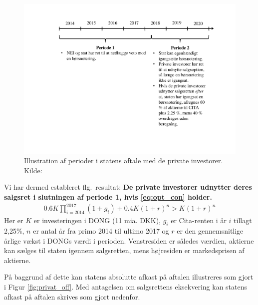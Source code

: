 \documentclass{article}
\begin{document}
\begin{figure}
\includegraphics[scale=0.6]{../figs/perioder}
\caption{Illustration af perioder i statens aftale med de private investorer. Kilde: \citet{FM2013a}}
\label{fig:comp}
\end{figure}









Vi har dermed estableret flg.\ resultat: \textbf{De private investorer udnytter deres salgsret i slutningen af periode 1, hvis \eqref{eq:opt_con} holder. } 
\begin{align}
0.6K\prod_{i=2014}^{2017}(1+g_i)+0.4K(1+r)^n>K(1+r)^n \label{eq:opt_con}
\end{align}
Her er $K$ er investeringen i DONG (11 mia. DKK), $g_i$ er Cita-renten i år $i$ tillagt 2,25\%, $n$ er antal år fra primo 2014 til ultimo 2017 og $r$ er den gennemsnitlige årlige vækst i DONGs værdi i perioden. Venstresiden er således værdien, aktierne kan sælges til staten igennem salgsretten, mens højresiden er markedsprisen af aktierne.

På baggrund af dette kan statens absolutte afkast på aftalen illustreres som gjort i Figur \ref{fig:privat_off}. Med antagelsen om salgsrettens eksekvering kan statens afkast på aftalen skrives som gjort nedenfor. %
\end{document}
